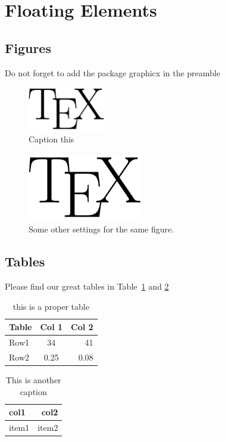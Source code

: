 \documentclass[12pt]{article}
\begin{document}


\section{Floating Elements}

\subsection{Figures}\label{figures}
Do not forget to add the package graphicx in the preamble


\begin{figure}[!h]
\centering
\includegraphics[width=0.3\textwidth]{TeX_logo.png} 
\caption{Caption this}
\label{fig:my_label} %
\end{figure}

\begin{figure}[!h]
\centering
\includegraphics[height=3cm, width=5cm, scale=1.2, angle=45]{TeX_logo.png} 
\caption{Some other settings for the same figure.}
\label{fig:my_second_figure} %
\end{figure}



\subsection{Tables}\label{table}
Please find our great tables in Table~\ref{table1} and \ref{table_other}
\begin{table}[h]
    \centering %
    \begin{tabular}{ | l || c | r | } %
        \hline
        Table & Col 1 & Col 2 \\ 
        \hline 
        Row1 & 34 & 41 \\ 
        \hline
        Row2 & 0.25 & 0.08 \\
        \hline
    \end{tabular}
    \caption{this is a proper table}
    \label{table1}
\end{table}

\begin{table}
    \begin{tabular*}{\textwidth}{ | l | r | } 
        \hline
        col1 & col2 \\
        \hline
        item1 & item2 \\ 
        \hline 
    \end{tabular*}
    \caption{This is another caption}
    \label{table_other}
\end{table}
\end{document}

